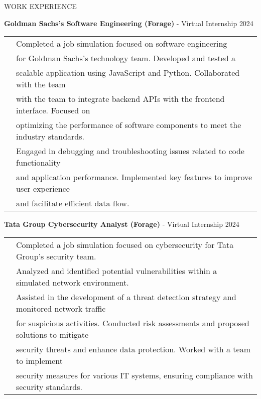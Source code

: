 \documentclass{resume}
\begin{document}
\begin{rSection}{WORK EXPERIENCE}
    \begin{itemize}
        {\bf Goldman Sachs's Software Engineering (Forage)} - Virtual Internship \hfill {2024}\\
        \begin{tabular}{>{\bfseries}l l}
            \textbf{} & Completed a job simulation focused on software engineering \\ &for Goldman Sachs's technology team. Developed and tested a \\
            & scalable application using JavaScript and Python. Collaborated with the team\\
            & with the team to integrate backend APIs with the frontend interface. Focused on\\
            & optimizing the performance of software components to meet the industry standards. \\
            & Engaged in debugging and troubleshooting issues related to code functionality  \\
            & and application performance. Implemented key features to improve user experience \\ &and facilitate efficient data flow. \\
        \end{tabular}
    \end{itemize}
    \begin{itemize}
        {\bf Tata Group Cybersecurity Analyst (Forage)} - Virtual Internship \hfill {2024}\\
        \begin{tabular}{>{\bfseries}l l}
            \textbf{} & Completed a job simulation focused on cybersecurity for Tata Group's security team. \\
            & Analyzed and identified potential vulnerabilities within a simulated network environment. \\
            & Assisted in the development of a threat detection strategy and monitored network traffic \\ & for suspicious activities. Conducted risk assessments and proposed solutions to mitigate\\
            & security threats and enhance data protection. Worked with a team to implement\\
            & security measures for various IT systems, ensuring compliance with security standards. \\
        \end{tabular}
    \end{itemize}
    
\end{rSection}
\end{document}
